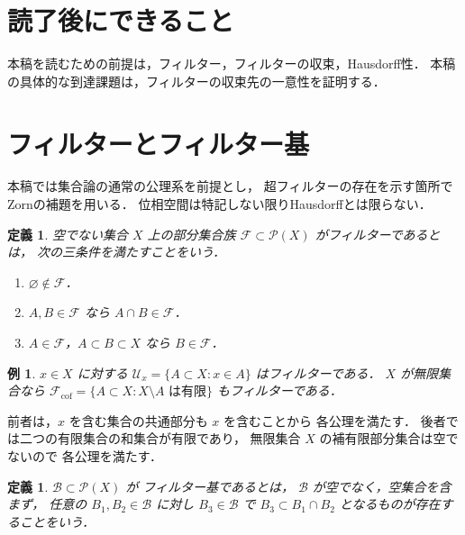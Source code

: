 \documentclass[a5paper,10pt,onecolumn]{jsarticle}
\makeatletter
\theoremstyle{mathnotetheorem}
\newtheorem{definition}[theorem]{定義}
\newtheorem{example}[theorem]{例}
\renewcommand{\proofname}{証明}
\renewenvironment{proof}[1][\proofname]{%
  \par\pushQED{\qed}\normalfont\topsep4\p@\@plus2\p@\relax
  \trivlist\item[\hskip\labelsep\bfseries #1]\ignorespaces
}{\popQED\endtrivlist\@endpefalse}
\makeatother
\begin{document}
\section*{読了後にできること}
本稿を読むための前提は，フィルター，フィルターの収束，Hausdorff性．
本稿の具体的な到達課題は，フィルターの収束先の一意性を証明する．

\section{フィルターとフィルター基}

本稿では集合論の通常の公理系を前提とし，
超フィルターの存在を示す箇所でZornの補題を用いる．
位相空間は特記しない限りHausdorffとは限らない．

\begin{definition}
空でない集合 $X$ 上の部分集合族
$\mathcal F\subset\mathcal P(X)$ が\emph{フィルター}であるとは，
次の三条件を満たすことをいう．
\begin{enumerate}
\item $\varnothing\notin\mathcal F$．
\item $A,B\in\mathcal F$ なら $A\cap B\in\mathcal F$．
\item $A\in\mathcal F$，$A\subset B\subset X$ なら
$B\in\mathcal F$．
\end{enumerate}
\end{definition}

\begin{example}
$x\in X$ に対する
$\mathcal U_x=\{A\subset X:x\in A\}$ はフィルターである．
$X$ が無限集合なら
$\mathcal F_{\mathrm{cof}}
 =\{A\subset X:X\setminus A\text{ は有限}\}$
もフィルターである．
\end{example}
\begin{proof}
前者は，$x$ を含む集合の共通部分も $x$ を含むことから
各公理を満たす．
後者では二つの有限集合の和集合が有限であり，
無限集合 $X$ の補有限部分集合は空でないので
各公理を満たす．
\end{proof}

\begin{definition}
$\mathcal B\subset\mathcal P(X)$ が
\emph{フィルター基}であるとは，
$\mathcal B$ が空でなく，空集合を含まず，
任意の $B_1,B_2\in\mathcal B$ に対し
$B_3\in\mathcal B$ で
$B_3\subset B_1\cap B_2$ となるものが存在することをいう．
\end{definition}
\end{document}
